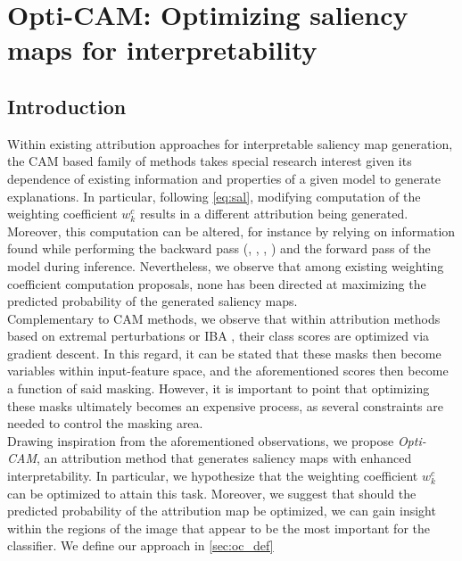 \chapter{Opti-CAM: Optimizing saliency maps for interpretability}
\chaptertoc{}
\label{ch:opticam}
\section{Introduction}
\label{sec:oc_intro}
\noindent Within existing attribution approaches for interpretable saliency map generation, the CAM  
\autocite{zhou2016learning} based family of methods takes special research interest given its 
dependence of existing  information and properties of a given model to generate explanations. In 
particular, following \autoref{eq:sal}, modifying computation of the weighting coefficient 
$w_k^c$ results in a different attribution being generated. Moreover, this computation can be 
altered, for instance by relying on information found while performing the backward pass 
(\cite{selvaraju2017grad}, \cite{chattopadhay2018grad}, \cite{axiombased}, 
\cite{smilkov2017smoothgrad}) and the forward pass \autocite{wang2020score} of the model during 
inference. Nevertheless, we observe that among existing weighting coefficient computation 
proposals, none has been directed at maximizing the predicted probability of the generated 
 saliency maps.\\

\noindent Complementary to CAM methods, we observe that within attribution methods based on 
extremal perturbations \autocite{fong2019understanding} or IBA \autocite{schulz2020restricting}, 
their class scores are optimized via gradient descent. In this regard, it can 
be stated that these masks then become variables within input-feature space, and the aforementioned 
scores then become a function of said masking. However, it is important to point that optimizing 
these masks ultimately becomes an expensive process, as several constraints are needed 
to control the masking area.\\

\noindent Drawing inspiration from the aforementioned observations, we propose 
\emph{Opti-CAM}, an attribution method that generates saliency maps with enhanced interpretability. 
In particular, we hypothesize that the weighting coefficient $w_k^c$ can be optimized to attain 
this task. Moreover, we  suggest that should the predicted probability of the attribution map 
be optimized, we can gain insight within the regions of the image that appear to be the most 
important for the classifier. We define our approach in \autoref{sec:oc_def}\\


